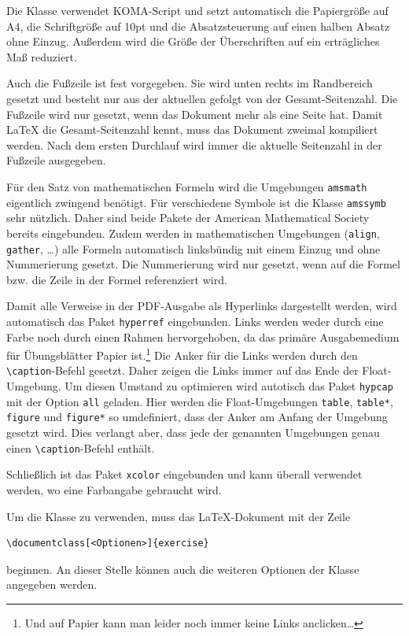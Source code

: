 \documentclass{exercise}
\begin{document}
    Die Klasse verwendet KOMA-Script \cite{koma} und setzt automatisch die
    Papiergröße auf A4, die Schriftgröße auf 10pt und die Absatzsteuerung auf
    einen halben Absatz ohne Einzug. Außerdem wird die Größe der Überschriften
    auf ein erträgliches Maß reduziert.

    Auch die Fußzeile ist fest vorgegeben. Sie wird unten rechts im Randbereich
    gesetzt und besteht nur aus der aktuellen gefolgt von der Gesamt-Seitenzahl.
    Die Fußzeile wird nur gesetzt, wenn das Dokument mehr als eine Seite hat.
    Damit \LaTeX{} die Gesamt-Seitenzahl kennt, muss das Dokument zweimal
    kompiliert werden. Nach dem ersten Durchlauf wird immer die aktuelle Seitenzahl
    in der Fußzeile ausgegeben.

    Für den Satz von mathematischen Formeln wird die Umgebungen \texttt{amsmath}
    \cite{amsmath} eigentlich zwingend benötigt. Für verschiedene Symbole ist
    die Klasse \texttt{amssymb} sehr nützlich. Daher sind beide Pakete der
    American Mathematical Society bereits eingebunden. Zudem werden in
    mathematischen Umgebungen (\texttt{align}, \texttt{gather}, \ldots) alle
    Formeln automatisch linksbündig mit einem Einzug und ohne Nummerierung
    gesetzt. Die Nummerierung wird nur gesetzt, wenn auf die Formel bzw. die
    Zeile in der Formel referenziert wird.

    Damit alle Verweise in der PDF-Ausgabe als Hyperlinks dargestellt werden,
    wird automatisch das Paket \texttt{hyperref} \cite{hyperref} eingebunden.
    Links werden weder durch eine Farbe noch durch einen Rahmen hervorgehoben,
    da das primäre Ausgabemedium für Übungsblätter Papier ist.\footnote{Und
    auf Papier kann man leider noch immer keine Links anclicken\ldots} Die
    Anker für die Links werden durch den \lstinline{\caption}-Befehl gesetzt. Daher
    zeigen die Links immer auf das Ende der Float-Umgebung. Um diesen Umstand
    zu optimieren wird autotisch das Paket \texttt{hypcap} \cite{hypcap} mit der
    Option \texttt{all} geladen. Hier werden die Float-Umgebungen \lstinline{table},
    \lstinline{table*}, \lstinline{figure} und \lstinline{figure*} so umdefiniert, dass
    der Anker am Anfang der Umgebung gesetzt wird. Dies verlangt aber, dass jede
    der genannten Umgebungen genau einen \lstinline{\caption}-Befehl enthält.

    Schließlich ist das Paket \texttt{xcolor} \cite{xcolor} eingebunden und kann
    überall verwendet werden, wo eine Farbangabe gebraucht wird.

    Um die Klasse zu verwenden, muss das \LaTeX{}-Dokument mit der Zeile
    \begin{lstlisting}[gobble=6]
      \documentclass[<Optionen>]{exercise}
    \end{lstlisting}
    beginnen. An dieser Stelle können auch die weiteren Optionen der Klasse
    angegeben werden.
\end{document}
